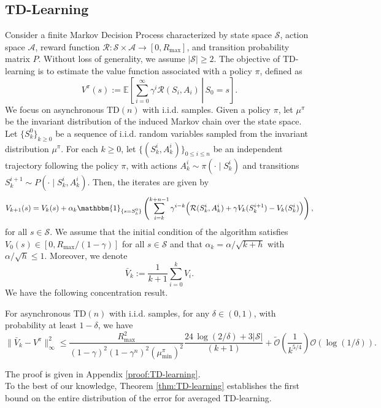 \documentclass[letterpaper, 10 pt]{article}
\newcommand{\E}{\mathbb{E}}
\begin{document}
\subsection{TD-Learning} 
Consider a finite Markov Decision Process characterized by state space $\mathcal{S}$, action space $\mathcal{A}$, reward function $\mathcal{R}: \mathcal{S}\times\mathcal{A}\rightarrow [0,R_{\max}]$, and transition probability matrix $P$. Without loss of generality, we assume $|\mathcal{S}|\geq 2$. The objective of TD-learning is to estimate the value function associated with a policy $\pi$, defined as
\[ V^\pi(s):=\E\left[\left. \sum_{i=0}^{\infty}\gamma^i \mathcal{R}(S_i,A_i) \,\right|\, S_0=s \right]. \]
We focus on asynchronous TD$(n)$ with i.i.d. samples. Given a policy $\pi$, let $\mu^\pi$ be the invariant distribution of the induced Markov chain over the state space. Let $\{S_k^0\}_{k\geq 0}$ be a sequence of i.i.d. random variables sampled from the invariant distribution $\mu^\pi$. For each $k\geq 0$, let $\{(S_k^i,A_k^i)\}_{0\leq i\leq n}$ be an independent trajectory following the policy $\pi$, with actions $A_k^{i} \sim\pi(\cdot\mid S_k^i)$ and transitions $S_{k}^{i+1} \sim P(\cdot\mid S_k^i,A_k^i)$. Then, the iterates are given by
\begin{align}\label{eq:TDn}
    V_{k+1}(s)= V_k(s)+ \alpha_k \mathbbm{1}_{\{s=S_k^0\}} \left( \sum_{i=k}^{k+n-1} \gamma^{i-k}\Big(\mathcal{R}(S_k^i,A_k^i)+\gamma V_k(S_k^{i+1}) - V_{k}(S_k^i)\Big)\right),
\end{align}
for all $s\in\mathcal{S}$. We assume that the initial condition of the algorithm satisfies $V_0(s)\in [0,R_{\max}/(1-\gamma)]$ for all $s\in\mathcal{S}$ and that $\alpha_k=\alpha/\sqrt{k+h}$ with $\alpha/\sqrt{h}\leq 1$. Moreover, we denote 
\[ \bar{V}_k := \frac{1}{k+1}\sum_{i=0}^k V_i. \]
We have the following concentration result.

\begin{theorem}\label{thm:TD-learning}
    For asynchronous TD$(n)$ with i.i.d. samples, for any $\delta\in(0,1)$, with probability at least $1-\delta$, we have
\[ \|\bar{V}_k-V^\pi\|_{\infty}^2 \leq \frac{R_{\max}^2}{(1-\gamma)^2(1-\gamma^n)^2(\mu^\pi_{\min})^2}\frac{24 \,\log(2/\delta)+3 |\mathcal{S}| }{(k+1)} + \tilde{\mathcal{O}}\left(\frac{1}{k^{5/4}}  \right) \mathcal{O}(\log(1/\delta)). \]
\end{theorem}
The proof is given in Appendix \ref{proof:TD-learning}.\\

To the best of our knowledge, Theorem \ref{thm:TD-learning} establishes the first bound on the entire distribution of the error for averaged TD-learning.
\end{document}
